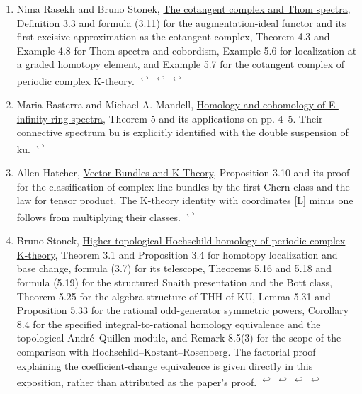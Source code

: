 \documentclass[11pt,letterpaper]{article}
\begin{document}
\begin{enumerate}[leftmargin=1.8em,label=\arabic*.,itemsep=.8em]
\item \hypertarget{note-rasekh-stonek}{}Nima Rasekh and Bruno Stonek, \href{https://arxiv.org/pdf/2005.01382}{The cotangent complex and Thom spectra}, Definition 3.3 and formula (3.11) for the augmentation-ideal functor and its first excisive approximation as the cotangent complex, Theorem 4.3 and Example 4.8 for Thom spectra and cobordism, Example 5.6 for localization at a graded homotopy element, and Example 5.7 for the cotangent complex of periodic complex K-theory. \hyperlink{citation-rasekh-stonek-1}{\textsuperscript{\(\hookleftarrow\)}} \hyperlink{citation-rasekh-stonek-2}{\textsuperscript{\(\hookleftarrow\)}} \hyperlink{citation-rasekh-stonek-3}{\textsuperscript{\(\hookleftarrow\)}}
\item \hypertarget{note-basterra-mandell}{}Maria Basterra and Michael A. Mandell, \href{https://arxiv.org/pdf/math/0407209}{Homology and cohomology of E-infinity ring spectra}, Theorem 5 and its applications on pp. 4–5. Their connective spectrum bu is explicitly identified with the double suspension of ku. \hyperlink{citation-basterra-mandell-1}{\textsuperscript{\(\hookleftarrow\)}}
\item \hypertarget{note-hatcher-bundles}{}Allen Hatcher, \href{https://pi.math.cornell.edu/~hatcher/VBKT/VB.pdf}{Vector Bundles and K-Theory}, Proposition 3.10 and its proof for the classification of complex line bundles by the first Chern class and the law for tensor product. The K-theory identity with coordinates [L] minus one follows from multiplying their classes. \hyperlink{citation-hatcher-bundles-1}{\textsuperscript{\(\hookleftarrow\)}}
\item \hypertarget{note-stonek}{}Bruno Stonek, \href{https://arxiv.org/pdf/1801.00156}{Higher topological Hochschild homology of periodic complex K-theory}, Theorem 3.1 and Proposition 3.4 for homotopy localization and base change, formula (3.7) for its telescope, Theorems 5.16 and 5.18 and formula (5.19) for the structured Snaith presentation and the Bott class, Theorem 5.25 for the algebra structure of THH of KU, Lemma 5.31 and Proposition 5.33 for the rational odd-generator symmetric powers, Corollary 8.4 for the specified integral-to-rational homology equivalence and the topological André–Quillen module, and Remark 8.5(3) for the scope of the comparison with Hochschild–Kostant–Rosenberg. The factorial proof explaining the coefficient-change equivalence is given directly in this exposition, rather than attributed as the paper's proof. \hyperlink{citation-stonek-1}{\textsuperscript{\(\hookleftarrow\)}} \hyperlink{citation-stonek-2}{\textsuperscript{\(\hookleftarrow\)}} \hyperlink{citation-stonek-3}{\textsuperscript{\(\hookleftarrow\)}} \hyperlink{citation-stonek-4}{\textsuperscript{\(\hookleftarrow\)}}

\end{enumerate}
\end{document}
